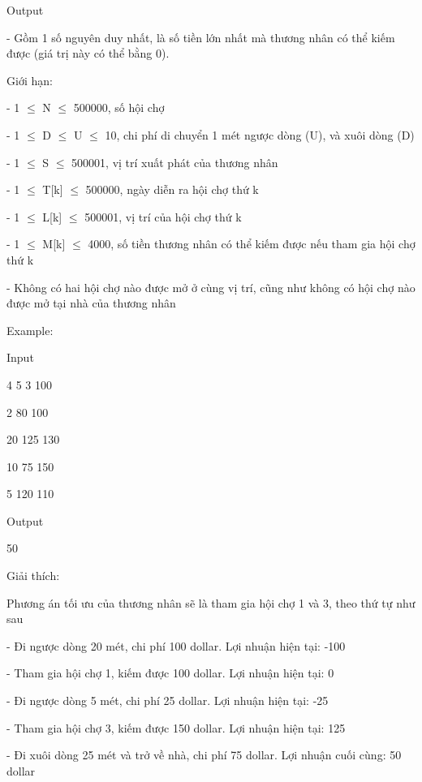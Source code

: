    Output   


   - Gồm 1 số nguyên duy nhất, là số tiền lớn nhất mà thương nhân có thể kiếm được (giá trị này có thể bằng 0).   





   Giới hạn:   


   - 1  $\le$  N  $\le$  500000, số hội chợ   


   - 1  $\le$  D  $\le$  U  $\le$  10, chi phí di chuyển 1 mét ngược dòng (U), và xuôi dòng (D)   


   - 1  $\le$  S  $\le$  500001, vị trí xuất phát của thương nhân   


   - 1  $\le$  T[k]  $\le$  500000, ngày diễn ra hội chợ thứ k   


   - 1  $\le$  L[k]  $\le$  500001, vị trí của hội chợ thứ k   


   - 1  $\le$  M[k]  $\le$  4000, số tiền thương nhân có thể kiếm được nếu tham gia hội chợ thứ k   


   - Không có hai hội chợ nào được mở ở cùng vị trí, cũng như không có hội chợ nào được mở tại nhà của thương nhân   





   Example:   


   Input   


   4 5 3 100   


   2 80 100   


   20 125 130   


   10 75 150   


   5 120 110   


   Output   


   50   





   Giải thích:   


   Phương án tối ưu của thương nhân sẽ là tham gia hội chợ 1 và 3, theo thứ tự như sau   


   - Đi ngược dòng 20 mét, chi phí 100 dollar. Lợi nhuận hiện tại: -100   


   - Tham gia hội chợ 1, kiếm được 100 dollar. Lợi nhuận hiện tại: 0   


   - Đi ngược dòng 5 mét, chi phí 25 dollar. Lợi nhuận hiện tại: -25   


   - Tham gia hội chợ 3, kiếm được 150 dollar. Lợi nhuận hiện tại: 125   


   - Đi xuôi dòng 25 mét và trở về nhà, chi phí 75 dollar. Lợi nhuận cuối cùng: 50 dollar  
